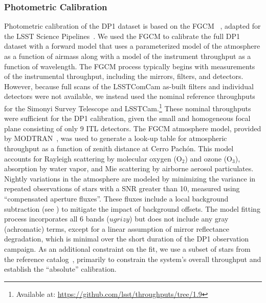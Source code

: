 \subsubsection{Photometric Calibration}
\label{photometric_calibration}
Photometric \gls{calibration} of the \gls{DP1} dataset is based on the \gls{FGCM} ~\citep[FGCM][]{2018AJ....155...41B}, adapted for the LSST Science Pipelines~\citep{2022PASJ...74..247A, SITCOMTN-086}.
We used the \gls{FGCM} to calibrate the full \gls{DP1} dataset with a forward model that uses a parameterized model of the atmosphere as a function of airmass along with a model of the instrument throughput as a function of wavelength.
The FGCM process typically begins with measurements of the instrumental throughput, including the mirrors, filters, and detectors.
However, because full scans of the \gls{LSSTComCam} as-built filters and individual detectors were not available, we instead used the nominal reference throughputs for the Simonyi Survey Telescope and LSSTCam.\footnote{Available at: \url{https://github.com/lsst/throughputs/tree/1.9}}
These nominal throughputs were sufficient for the \gls{DP1} calibration, given the small and homogeneous focal plane consisting of only 9 \gls{ITL} detectors.
The FGCM atmosphere model, provided by MODTRAN~\citep{1999SPIE.3756..348B}, was used to generate a look-up table for atmospheric throughput as a function of zenith distance at Cerro Pachón.
This model accounts for Rayleigh scattering by molecular oxygen ($\mathrm{O}_2$) and ozone ($\mathrm{O}_3$), absorption by water vapor, and Mie scattering by airborne aerosol particulates.
Nightly variations in the atmosphere are modeled by minimizing the variance in repeated observations of stars with a \gls{SNR} greater than 10, measured using ``compensated aperture fluxes''.
These fluxes include a local \gls{background} subtraction (see ) to mitigate the impact of \gls{background} offsets.
The model fitting process incorporates all 6 bands ($ugrizy$) but does not include any gray (achromatic) terms, except for a linear assumption of mirror reflectance degradation, which is minimal over the short duration of the \gls{DP1} observation campaign.
As an additional constraint on the fit, we use a subset of stars from the reference catalog~\citep{DMTN-277}, primarily to constrain the system's overall throughput and establish the ``absolute'' calibration.

